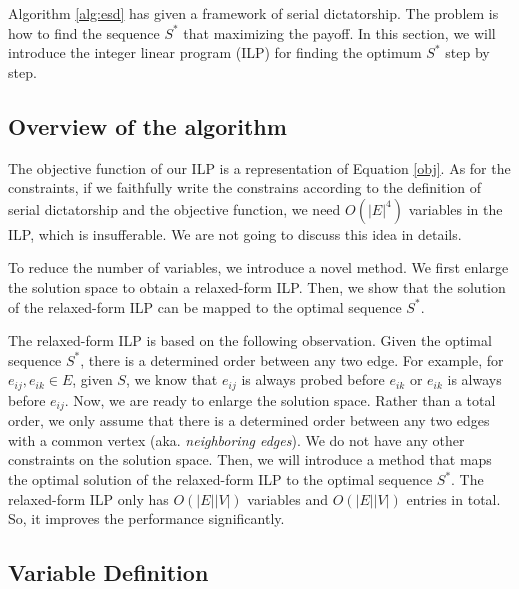 \documentclass[letterpaper]{article}
\begin{document}
Algorithm \ref{alg:esd} has given a framework of serial dictatorship. 
The problem is how to find the sequence $S^*$ that maximizing the payoff.
In this section, we will introduce the integer linear program (ILP) for finding the optimum $S^*$ step by step.

\subsection{Overview of the algorithm}

The objective function of our ILP is a representation of Equation \ref{obj}.
As for the constraints, if we faithfully write the constrains according to the definition of serial dictatorship and the objective function, we need $O(|E|^4)$ variables in the ILP, which is insufferable. We are not going to discuss this idea in details.

To reduce the number of variables, we introduce a novel method.
We first enlarge the solution space to obtain a relaxed-form ILP.
Then, we show that the solution of the relaxed-form ILP can be mapped to the optimal sequence $S^*$.

The relaxed-form ILP is based on the following observation.
Given the optimal sequence $S^*$, there is a determined order between any two edge.
For example, for $e_{ij}, e_{ik}\in E$, given $S$, we know that $e_{ij}$ is always probed before $e_{ik}$ or $e_{ik}$ is always before $e_{ij}$.
Now, we are ready to enlarge the solution space.
Rather than a total order, we only assume that there is a determined order between any two edges with a common vertex (aka. \textit{neighboring edges}).
We do not have any other constraints on the solution space.
Then, we will introduce a method that maps the optimal solution of the relaxed-form ILP to the optimal sequence $S^*$.
The relaxed-form ILP only has $O(|E||V|)$ variables and $O(|E||V|)$ entries in total.
So, it improves the performance significantly.

\subsection{Variable Definition}
\end{document}
